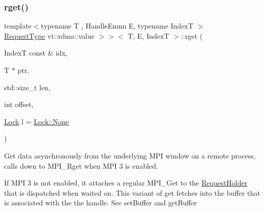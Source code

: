 \subsubsection{\texorpdfstring{rget()}{rget()}\hspace{0.1cm}{\footnotesize\ttfamily [1/2]}}
{\footnotesize\ttfamily template$<$typename T , Handle\+Enum E, typename IndexT $>$ \\
\hyperlink{structvt_1_1rdma_1_1_base_typed_handle_a449c2c1948f5793c3fdfb1aba5801ed7}{Request\+Type} vt\+::rdma\+::value $>$$>$$<$ T, E, IndexT $>$\+::rget (\begin{DoxyParamCaption}\item[{IndexT const \&}]{idx,  }\item[{T $\ast$}]{ptr,  }\item[{std\+::size\+\_\+t}]{len,  }\item[{int}]{offset,  }\item[{\hyperlink{namespacevt_1_1rdma_ac5c20b41a653e520b6305d4d454ecb70}{Lock}}]{l = {\ttfamily \hyperlink{namespacevt_1_1rdma_ac5c20b41a653e520b6305d4d454ecb70a6adf97f83acf6453d4a6a4b1070f3754}{Lock\+::\+None}} }\end{DoxyParamCaption})}



Get data asynchronously from the underlying M\+PI window on a remote process, calls down to {\ttfamily M\+P\+I\+\_\+\+Rget} when M\+PI 3 is enabled. 

If M\+PI 3 is not enabled, it attaches a regular {\ttfamily M\+P\+I\+\_\+\+Get} to the {\ttfamily \hyperlink{structvt_1_1rdma_1_1_request_holder}{Request\+Holder}} that is dispatched when waited on. This variant of {\ttfamily get} fetches into the buffer that is associated with the the handle. See {\ttfamily set\+Buffer} and {\ttfamily get\+Buffer} 


